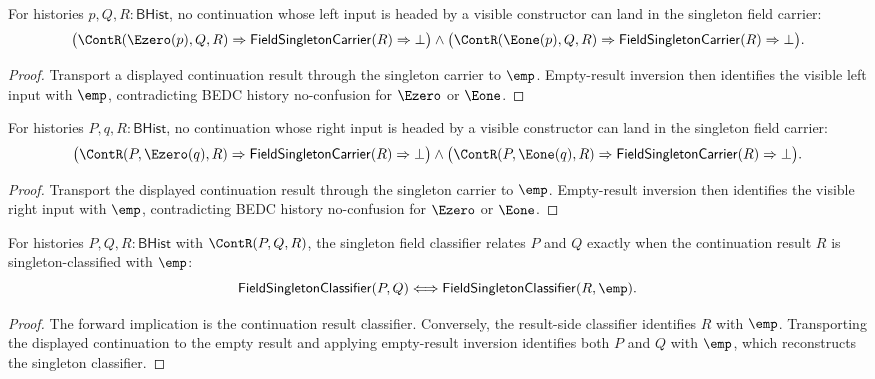 \begin{theorem}
\label{thm:field-singleton-carrier-continuation-visible-left-absurd}
For histories $p,Q,R:\mathsf{BHist}$, no continuation whose left input is
headed by a visible constructor can land in the singleton field carrier:
$$
\bigl(\ContR(\Ezero(p),Q,R)\Rightarrow
  \mathsf{FieldSingletonCarrier}(R)\Rightarrow\bot\bigr)
\land
\bigl(\ContR(\Eone(p),Q,R)\Rightarrow
  \mathsf{FieldSingletonCarrier}(R)\Rightarrow\bot\bigr).
$$
\end{theorem}
\begin{proof}
Transport a displayed continuation result through the singleton carrier to
$\emp$. Empty-result inversion then identifies the visible left input with
$\emp$, contradicting BEDC history no-confusion for $\Ezero$ or $\Eone$.
\end{proof}

\begin{theorem}
\label{thm:field-singleton-carrier-continuation-visible-right-absurd}
For histories $P,q,R:\mathsf{BHist}$, no continuation whose right input is
headed by a visible constructor can land in the singleton field carrier:
$$
\bigl(\ContR(P,\Ezero(q),R)\Rightarrow
  \mathsf{FieldSingletonCarrier}(R)\Rightarrow\bot\bigr)
\land
\bigl(\ContR(P,\Eone(q),R)\Rightarrow
  \mathsf{FieldSingletonCarrier}(R)\Rightarrow\bot\bigr).
$$
\end{theorem}
\begin{proof}
Transport the displayed continuation result through the singleton carrier to
$\emp$. Empty-result inversion then identifies the visible right input with
$\emp$, contradicting BEDC history no-confusion for $\Ezero$ or $\Eone$.
\end{proof}

\begin{theorem}
\label{thm:field-singleton-classifier-continuation-empty-result-iff}
For histories $P,Q,R:\mathsf{BHist}$ with $\ContR(P,Q,R)$, the singleton
field classifier relates $P$ and $Q$ exactly when the continuation result $R$
is singleton-classified with $\emp$:
$$
\mathsf{FieldSingletonClassifier}(P,Q)
\Longleftrightarrow
\mathsf{FieldSingletonClassifier}(R,\emp).
$$
\end{theorem}
\begin{proof}
The forward implication is the continuation result classifier. Conversely, the
result-side classifier identifies $R$ with $\emp$. Transporting the displayed
continuation to the empty result and applying empty-result inversion identifies
both $P$ and $Q$ with $\emp$, which reconstructs the singleton classifier.
\end{proof}

